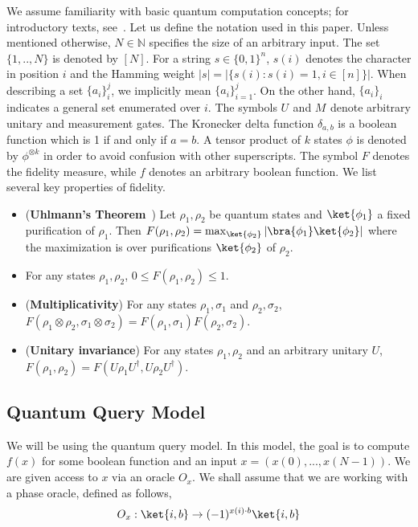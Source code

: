 \documentclass[10pt,a4paper]{article}
\newcommand{\unitarygate}[2][]{\ensuremath{U^{#1}_{#2}}\xspace}
\newcommand{\measurementgate}[2][]{\ensuremath{M^{#1}_{#2}}\xspace}
\begin{document}
We assume familiarity with basic quantum computation concepts; for introductory texts, see~\cite{Nielsen_Chuang, watrous_lecture_notes}.
Let us define the notation used in this paper. Unless mentioned otherwise, $N\in \mathbb{N}$ specifies the size of an arbitrary input. The set $\{1,..,N\}$ is denoted by $[N]$. For a string $s\in \{0,1\}^n$, $s(i)$ denotes the character in position $i$ and the Hamming weight $|s| = |\{s(i): s(i)=1, i\in [n]\}|$. When describing a set $\{a_i\}_i^j$, we implicitly mean $\{a_i\}_{i=1}^j$. On the other hand, $\{a_i\}_i$ indicates a general set enumerated over $i$. The symbols \unitarygate{} and \measurementgate{} denote arbitrary unitary and measurement gates. The Kronecker delta function $\delta_{a,b}$ is a boolean function which is 1 if and only if $a=b$.
A tensor product of $k$ states $\phi$ is denoted by $\phi^{\otimes k}$ in order to avoid confusion with other superscripts.
The symbol $F$ denotes the fidelity measure, while $f$ denotes an arbitrary boolean function. We list several key properties of fidelity.

\begin{itemize}
    \item (\textbf{Uhlmann's Theorem}~\cite{uhlmann_theorem}) Let $\rho_1, \rho_2$ be quantum states and $\ket{\phi_1}$ a fixed purification of $\rho_1$. Then $F(\rho_1, \rho_2) = \max_{\ket{\phi_2}}  \left| \bra{\phi_1}\ket{\phi_2} \right|$ where the maximization is over purifications $\ket{\phi_2}$ of $\rho_2$.
    \item For any states $\rho_1, \rho_2$, $0\leq F(\rho_1, \rho_2)\leq 1$.
    \item (\textbf{Multiplicativity}) For any states $\rho_1, \sigma_1$ and $\rho_2, \sigma_2$, $F(\rho_1\otimes \rho_2, \sigma_1 \otimes \sigma_2 ) = F(\rho_1,\sigma_1 )F(\rho_2,\sigma_2 )$.
    \item (\textbf{Unitary invariance}) For any states $\rho_1, \rho_2$ and an arbitrary unitary $U$, $F(\rho_1, \rho_2) = F(U \rho_1 U^\dagger, U \rho_2 U^\dagger )$.
\end{itemize}

\subsection{Quantum Query Model}

We will be using the quantum query model. In this model, the goal is to compute $f(x)$ for some boolean function and an input $x = (x(0), ...,x(N-1))$. We are given access to $x$ via an oracle $O_x$. We shall assume that we are working with a phase oracle, defined as follows,
\begin{align*}
    O_x: \ket{i,b} \rightarrow (-1)^{x(i)\cdot b}\ket{i,b}
\end{align*}
\end{document}
